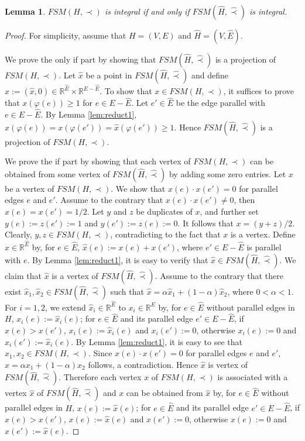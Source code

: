 \documentclass[11pt]{article}
\newtheorem{lemma}[theorem]{Lemma}
\numberwithin{theorem}{section}
\begin{document}
\begin{lemma}
\label{lem:reduct4}
$FSM(H,\prec)$ is integral if and only if $FSM(\hat{H},\hat\prec)$ is integral.
\end{lemma}
\begin{proof}
For simplicity, assume that $H=(V,E)$ and $\hat{H}=(V,\hat{E})$.

We prove the only if part by showing that $FSM(\hat{H},\hat\prec)$ is a projection of $FSM(H,\prec)$. 
Let $\hat{x}$ be a point in $FSM(\hat{H},\hat\prec)$ and define $x:=(\hat{x},0)\in \mathbb{R}^{\hat{E}}\times \mathbb{R}^{E-\hat{E}}$. To show that $x\in FSM(H,\prec)$, it suffices to prove that $x(\varphi(e))\geq 1$ for $e\in E-\hat{E}$. Let $e'\in \hat{E}$ be the edge parallel with $e\in E-\hat{E}$. By Lemma \ref{lem:reduct1}, $x(\varphi(e))=x(\varphi(e'))=\hat{x}(\varphi(e'))\geq 1$. Hence $FSM(\hat{H},\hat\prec)$ is a projection of $FSM(H,\prec)$.

We prove the if part by showing that each vertex of $FSM(H,\prec)$ can be obtained from some vertex of $FSM(\hat{H},\hat\prec)$ by adding some zero entries.
Let $x$ be a vertex of $FSM(H,\prec)$.
We show that $x(e)\cdot x(e')=0$ for parallel edges $e$ and $e'$. 
Assume to the contrary that $x(e)\cdot x(e')\not=0$, then $x(e)=x(e')=1/2$. Let $y$ and $z$ be duplicates of $x$, and further set $y (e):=z(e'):=1$ and $y (e'):=z(e):=0$. It follows that $x= (y + z)/2$. Clearly, $y,z\in FSM(H,\prec)$, contradicting to the fact that $x$ is a vertex.
Define $\hat{x}\in \mathbb{R}^{\hat{E}}$ by, for $e\in \hat{E}$, $\hat{x}(e):=x(e)+x(e')$, where $e'\in E-\hat{E}$ is parallel with $e$. By Lemma \ref{lem:reduct1}, it is easy to verify that $\hat{x}\in FSM(\hat{H},\hat\prec)$. We claim that $\hat{x}$ is a vertex of $FSM(\hat{H},\hat\prec)$. Assume to the contrary that there exist $\hat{x}_1, \hat{x}_2 \in FSM(\hat{H},\hat\prec)$ such that $\hat{x}=\alpha \hat{x}_1+ (1-\alpha)\hat{x}_2$, where $0<\alpha<1$. For $i=1,2$, we extend $\hat{x}_i\in \mathbb{R}^{\hat{E}}$ to $x_i\in \mathbb{R}^{E}$ by, for $e\in \hat{E}$ without parallel edges in $H$, $x_i(e):=\hat{x}_i(e)$; for $e\in\hat{E}$ and its parallel edge $e'\in E-\hat{E}$, if $x(e)>x(e')$, $x_i(e):=\hat{x}_i(e)$ and $x_i(e'):=0$, otherwise $x_i(e):=0$ and $x_i(e'):=\hat{x}_i(e)$. By Lemma \ref{lem:reduct1}, it is easy to see that $x_1,x_2\in FSM(H,\prec)$. 
Since $x(e)\cdot x(e')=0$ for parallel edges $e$ and $e'$, $x=\alpha x_1+(1-\alpha) x_2$ follows, a contradiction. Hence $\hat{x}$ is vertex of $FSM(\hat{H},\hat\prec)$. Therefore each vertex $x$ of $FSM(H,\prec)$ is associated with a vertex $\hat{x}$ of $FSM(\hat{H},\hat\prec)$ and $x$ can be obtained from $\hat{x}$ by, for $e\in \hat{E}$ without parallel edges in $H$, $x(e):=\hat{x}(e)$; for $e\in\hat{E}$ and its parallel edge $e'\in E-\hat{E}$, if $x(e)>x(e')$, $x(e):=\hat{x}(e)$ and $x(e'):=0$, otherwise $x(e):=0$ and $x(e'):=\hat{x}(e)$. 
\end{proof}
\end{document}
